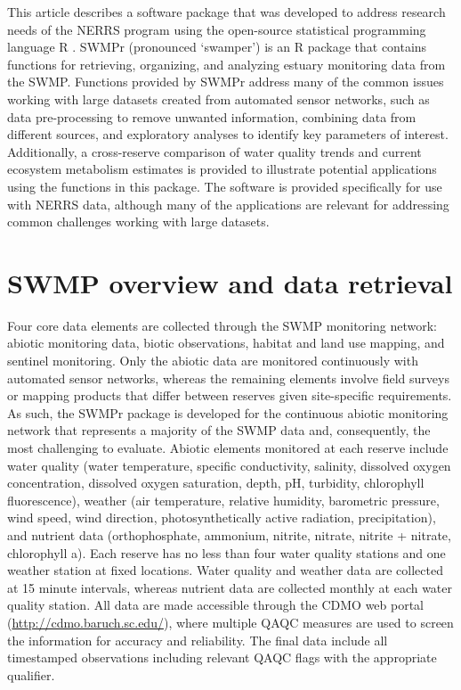 \documentclass[10pt,letterpaper]{article}\usepackage[]{graphicx}\usepackage[]{color}
\begin{document}
This article describes a software package that was developed to address research needs of the \gls{NERRS} program using the open-source statistical programming language R \cite{RDCT14}.  SWMPr (pronounced `swamper') is an R package that contains functions for retrieving, organizing, and analyzing estuary monitoring data from the \acrlong{SWMP}.  Functions provided by SWMPr address many of the common issues working with large datasets created from automated sensor networks, such as data pre-processing to remove unwanted information, combining data from different sources, and exploratory analyses to identify key parameters of interest.  Additionally, a cross-reserve comparison of water quality trends and current ecosystem metabolism estimates is provided to illustrate potential applications using the functions in this package.  The software is provided specifically for use with \gls{NERRS} data, although many of the applications are relevant for addressing common challenges working with large datasets.

\section*{SWMP overview and data retrieval}

Four core data elements are collected through the \gls{SWMP} monitoring network: abiotic monitoring data, biotic observations, habitat and land use mapping, and sentinel monitoring.  Only the abiotic data are monitored continuously with automated sensor networks, whereas the remaining elements involve field surveys or mapping products that differ between reserves given site-specific requirements.  As such, the SWMPr package is developed for the continuous abiotic monitoring network that represents a majority of the \gls{SWMP} data and, consequently, the most challenging to evaluate.  Abiotic elements monitored at each reserve include water quality (water temperature, specific conductivity, salinity, dissolved oxygen concentration, dissolved oxygen saturation, depth, pH, turbidity, chlorophyll fluorescence), weather (air temperature, relative humidity, barometric pressure, wind speed, wind direction, photosynthetically active radiation, precipitation), and nutrient data (orthophosphate, ammonium, nitrite, nitrate, nitrite + nitrate, chlorophyll a).  Each reserve has no less than four water quality stations and one weather station at fixed locations.  Water quality and weather data are collected at 15 minute intervals, whereas nutrient data are collected monthly at each water quality station.  All data are made accessible through the \gls{CDMO} web portal (\url{http://cdmo.baruch.sc.edu/}), where multiple \gls{QAQC} measures are used to screen the information for accuracy and reliability.  The final data include all timestamped observations including relevant \gls{QAQC} flags with the appropriate qualifier.
\end{document}
